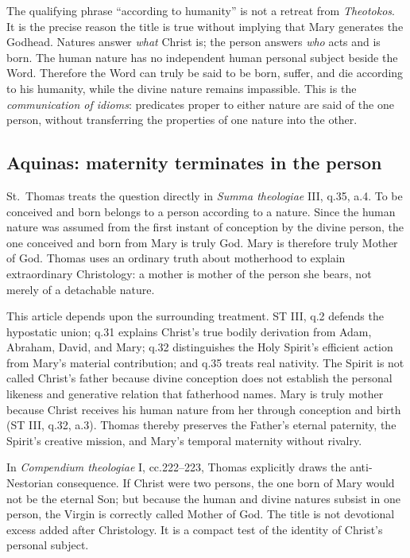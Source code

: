 The qualifying phrase ``according to humanity'' is not a retreat from \emph{Theotokos}. It is the precise reason the title is true without implying that Mary generates the Godhead. Natures answer \emph{what} Christ is; the person answers \emph{who} acts and is born. The human nature has no independent human personal subject beside the Word. Therefore the Word can truly be said to be born, suffer, and die according to his humanity, while the divine nature remains impassible. This is the \emph{communication of idioms}: predicates proper to either nature are said of the one person, without transferring the properties of one nature into the other.

\subsection{Aquinas: maternity terminates in the person}

St.~Thomas treats the question directly in \emph{Summa theologiae} III, q.35, a.4. To be conceived and born belongs to a person according to a nature. Since the human nature was assumed from the first instant of conception by the divine person, the one conceived and born from Mary is truly God. Mary is therefore truly Mother of God. Thomas uses an ordinary truth about motherhood to explain extraordinary Christology: a mother is mother of the person she bears, not merely of a detachable nature.

This article depends upon the surrounding treatment. ST III, q.2 defends the hypostatic union; q.31 explains Christ's true bodily derivation from Adam, Abraham, David, and Mary; q.32 distinguishes the Holy Spirit's efficient action from Mary's material contribution; and q.35 treats real nativity. The Spirit is not called Christ's father because divine conception does not establish the personal likeness and generative relation that fatherhood names. Mary is truly mother because Christ receives his human nature from her through conception and birth (ST III, q.32, a.3). Thomas thereby preserves the Father's eternal paternity, the Spirit's creative mission, and Mary's temporal maternity without rivalry.

In \emph{Compendium theologiae} I, cc.222--223, Thomas explicitly draws the anti-Nestorian consequence. If Christ were two persons, the one born of Mary would not be the eternal Son; but because the human and divine natures subsist in one person, the Virgin is correctly called Mother of God. The title is not devotional excess added after Christology. It is a compact test of the identity of Christ's personal subject.

